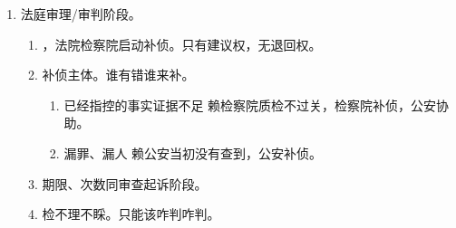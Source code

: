 \begin{enumerate}
\begin{enumerate}
\begin{enumerate}
                  \item 捕诉部门（哪里来哪里去）。。
                  \item 自侦 \hz 监委的案子（退回 \dy 自己来）。。
                  \item 自己来。。
                  \item 退回要求。（事项、理由、方向、需要补充的证据、证明作用）、案卷材料公安/监委。
                  \item 查好了 \yjt 补充起诉意见书、案卷材料、证据 \yjt 移送同级检。
                  \item {}、不管管辖转和变。
                  \item {}。
                        \begin{enumerate}
                          \item {}。
                          \item 退 2 次后并不当然就是存疑不起诉！！
                                。
                        \end{enumerate}
                \end{enumerate}
          \item 法庭审理/审判阶段。
                \begin{enumerate}
                  \item {}，法院检察院启动补侦。只有建议权，无退回权。
                  \item 补侦主体。谁有错谁来补。
                        \begin{enumerate}
                          \item 已经指控的事实证据不足 \yjt 赖检察院质检不过关，检察院补侦，公安协助。
                          \item 漏罪、漏人 \yjt 赖公安当初没有查到，公安补侦。
                        \end{enumerate}
                  \item 期限、次数同审查起诉阶段。
                  \item 检不理不睬。只能该咋判咋判。
                \end{enumerate}
        \end{enumerate}
\end{enumerate}

